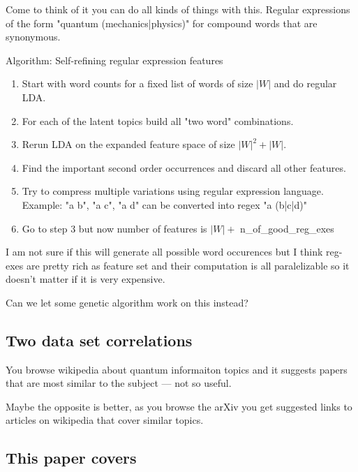 \documentclass[11pt]{article}
\begin{document}
		Come to think of it you can do all kinds of things with this.
		Regular expressions of the form "quantum (mechanics|physics)" for compound words 
		that are synonymous. 
		
		Algorithm: Self-refining regular expression features
		\begin{enumerate}
			\item	Start with word counts for a fixed list of words of size $|W|$ and do regular LDA.
			\item	For each of the latent topics build all "two word" combinations.
			\item	Rerun LDA on the expanded feature space of size $|W|^2 + |W|$.
			\item	Find the important second order occurrences and discard all other features.
			\item	Try to compress multiple variations using regular expression language. \\
					Example: "a b", "a c", "a d"  can be converted into regex "a (b|c|d)"
			\item	Go to step 3 but now number of features is $|W|+$ n\_of\_good\_reg\_exes
		\end{enumerate}

		I am not sure if this will generate all possible word occurences but I think reg-exes are
		pretty rich as feature set and their computation is all paralelizable so it doesn't matter if 
		it is very expensive.
		
		
		Can we let some genetic algorithm work on this instead?



    \subsection{Two data set correlations}

        You browse wikipedia about quantum informaiton topics and it suggests
        papers that are most similar to the subject --- not so useful.

        Maybe the opposite is better, as you browse the arXiv you get suggested
        links to articles on wikipedia that cover similar topics.




	
	\subsection{This paper covers}
	
\end{document}
